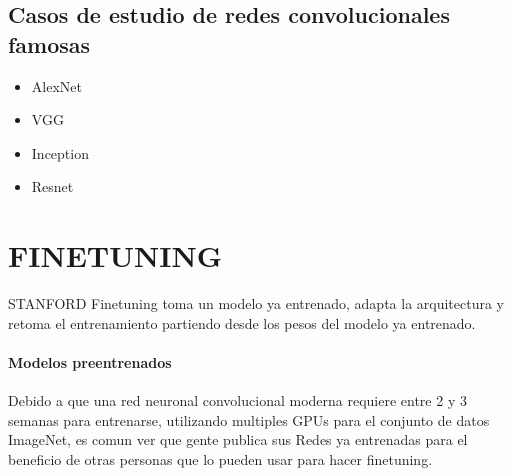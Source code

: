 \documentclass[a4paper,12pt,spanish]{book}
\begin{document}
    \subsection {Casos de estudio de redes convolucionales famosas}
      \begin{itemize}
	\item AlexNet
	\item VGG
	\item Inception
	\item Resnet
      \end{itemize}

    \section {FINETUNING}
    STANFORD
      Finetuning toma un modelo ya entrenado, adapta la arquitectura y retoma el entrenamiento partiendo desde los pesos del modelo ya entrenado.
      \paragraph{Modelos preentrenados}
	Debido a que una red neuronal convolucional moderna requiere entre 2 y 3 semanas para entrenarse, utilizando multiples GPUs para el conjunto de datos ImageNet, es comun ver que gente
	publica sus Redes ya entrenadas para el beneficio de otras personas que lo pueden usar para hacer finetuning.
\end{document}
